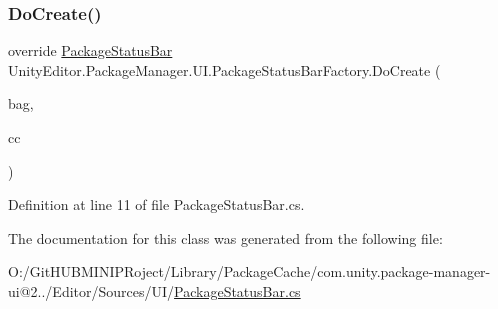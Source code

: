\subsubsection{\texorpdfstring{DoCreate()}{DoCreate()}}
{\footnotesize\ttfamily override \mbox{\hyperlink{class_unity_editor_1_1_package_manager_1_1_u_i_1_1_package_status_bar}{Package\+Status\+Bar}} Unity\+Editor.\+Package\+Manager.\+U\+I.\+Package\+Status\+Bar\+Factory.\+Do\+Create (\begin{DoxyParamCaption}\item[{I\+Uxml\+Attributes}]{bag,  }\item[{Creation\+Context}]{cc }\end{DoxyParamCaption})\hspace{0.3cm}{\ttfamily [protected]}}



Definition at line 11 of file Package\+Status\+Bar.\+cs.



The documentation for this class was generated from the following file\+:\begin{DoxyCompactItemize}
\item 
O\+:/\+Git\+H\+U\+B\+M\+I\+N\+I\+P\+Roject/\+Library/\+Package\+Cache/com.\+unity.\+package-\/manager-\/ui@2../\+Editor/\+Sources/\+U\+I/\mbox{\hyperlink{_package_status_bar_8cs}{Package\+Status\+Bar.\+cs}}\end{DoxyCompactItemize}
